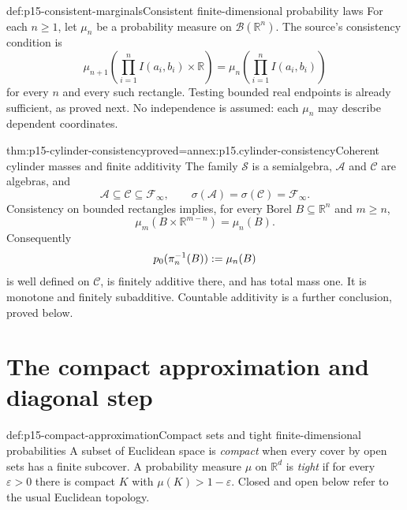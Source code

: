 \begin{hbdefinition}{def:p15-consistent-marginals}{Consistent finite-dimensional probability laws}
For each \(n\geq1\), let \(\mu_n\) be a probability measure
on \(\mathcal B(\mathbb R^n)\). The source's consistency condition is
\[
 \mu_{n+1}\left(\prod_{i=1}^n I(a_i,b_i)\times\mathbb R\right)
            =\mu_n\left(\prod_{i=1}^n I(a_i,b_i)\right)
\]
for every \(n\) and every such rectangle. Testing bounded real
endpoints is already sufficient, as proved next. No independence is
assumed: each \(\mu_n\) may describe dependent coordinates.
\end{hbdefinition}

\begin{hblemma}{thm:p15-cylinder-consistency}{proved=annex:p15.cylinder-consistency}{Coherent cylinder masses and finite additivity}
The family \(\mathcal S\) is a semialgebra, \(\mathcal A\) and
\(\mathcal C\) are algebras, and
\[
 \mathcal A\subseteq\mathcal C\subseteq\mathcal F_\infty,
 \qquad \sigma(\mathcal A)=\sigma(\mathcal C)=\mathcal F_\infty.
\]
Consistency on bounded rectangles implies, for every Borel \(B\subseteq
\mathbb R^n\) and \(m\geq n\),
\[
                  \mu_m(B\times\mathbb R^{m-n})=\mu_n(B).
\]
Consequently
\[
 p_0(\pi_n^{-1}(B))\mathrel{:=}\mu_n(B)
\]
is well defined on \(\mathcal C\), is finitely additive there,
and has total mass one. It is monotone and finitely subadditive.
Countable additivity is a further conclusion, proved below.
\end{hblemma}

\section{The compact approximation and diagonal step}
\label{sec:p15-cylinder-compactness}

\begin{hbdefinition}{def:p15-compact-approximation}{Compact sets and tight finite-dimensional probabilities}
A subset of Euclidean space is \emph{compact} when every cover by
open sets has a finite subcover. A probability measure \(\mu\) on
\(\mathbb R^d\) is \emph{tight} if for every \(\varepsilon>0\)
there is compact \(K\) with \(\mu(K)>1-\varepsilon\).
Closed and open below refer to the usual Euclidean topology.
\end{hbdefinition}

